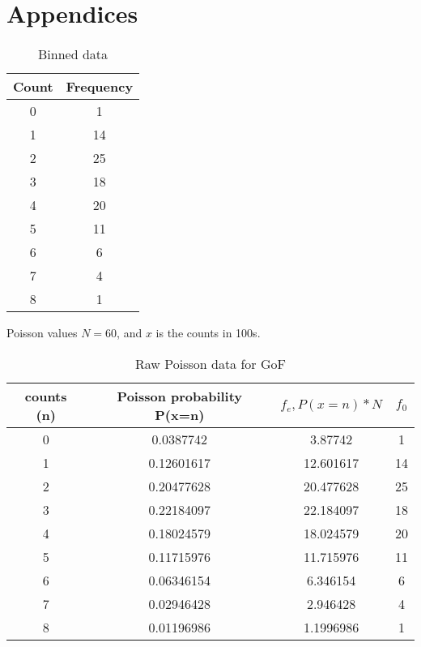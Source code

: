 \documentclass[11pt]{article}
\begin{document}
    \section{Appendices}
    \begin{table}[b]
        \centering
        \begin{tabular}{|c|c|}
        \hline
          \textbf{Count}  & \textbf{Frequency} \\
          \hline
           0  & 1 \\
           1 & 14\\
           2  & 25 \\
           3  & 18 \\
           4  & 20 \\
           5  & 11 \\
           6  & 6\\
           7  & 4 \\
           8  & 1 \\
           
           \hline
        \end{tabular}
        \caption{Binned data}
        \label{tab:my_label}
    \end{table}
    Poisson values 
    $N = 60$, and $x$ is the counts in 100s. 
    \begin{table}[]
        \centering
        \begin{tabular}{|c|c|c|c|}
         \hline
           counts (n)  & Poisson probability P(x=n) & $ f_{e}, P(x=n) * N$ & $f_{0}$ \\
            \hline
            0 & 0.0387742 & 3.87742 & 1 \\
            1 & 0.12601617 & 12.601617 & 14\\
            2 & 0.20477628 & 20.477628 & 25\\
            3 & 0.22184097 & 22.184097 & 18\\
            4 & 0.18024579 & 18.024579 & 20\\
            5 & 0.11715976 & 11.715976 & 11\\
            6 & 0.06346154 & 6.346154 & 6 \\
            7 & 0.02946428 & 2.946428 & 4\\
            8 & 0.01196986 & 1.1996986 & 1\\
             \hline

        \end{tabular}
        \caption{Raw Poisson data for GoF}
        \label{tab:my_label}
    \end{table}
\end{document}
